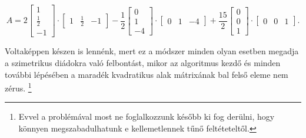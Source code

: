 \documentclass[9pt, a4paper, showtrims]{memoir}
\theoremstyle{plain}
\theoremstyle{remark}
\theoremstyle{definition}
\begin{document}
    \[
        A
        =
        2
        \begin{bmatrix}
        1\\ \frac{1}{2}\\ -1
        \end{bmatrix}
        \cdot
        \begin{bmatrix}
        1& \frac{1}{2}& -1
        \end{bmatrix}
        -\frac{1}{2}
        \begin{bmatrix}
            0\\1\\-4
        \end{bmatrix}
        \cdot
        \begin{bmatrix}
            0&1&-4
        \end{bmatrix}
        +
        \frac{15}{2}
        \begin{bmatrix}
            0\\0\\1
        \end{bmatrix}
        \cdot
        \begin{bmatrix}
            0&0&1
        \end{bmatrix}.
    \]

Voltaképpen készen is lennénk, mert
ez a módszer minden olyan esetben megadja a szimetrikus diádokra való felbontást,
mikor az algoritmus kezdő és minden további lépésében a maradék kvadratikus alak mátrixának bal felső eleme nem zérus.%
\footnote{
Evvel a problémával most ne foglalkozzunk később ki fog derülni, 
hogy könnyen megszabadulhatunk e kellemetlennek tűnő feltéteteltől.}
\end{document}
